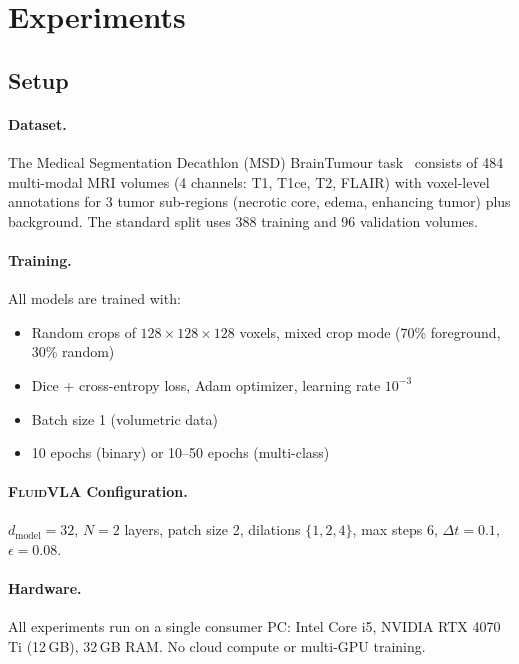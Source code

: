 \documentclass{article}
\newcommand{\fluidvla}{\textsc{FluidVLA}}
\begin{document}
\section{Experiments}
\label{sec:experiments}

\subsection{Setup}

\paragraph{Dataset.}
The Medical Segmentation Decathlon (MSD) BrainTumour task~\cite{antonelli2022msd} consists of 484 multi-modal MRI volumes (4 channels: T1, T1ce, T2, FLAIR) with voxel-level annotations for 3 tumor sub-regions (necrotic core, edema, enhancing tumor) plus background. The standard split uses 388 training and 96 validation volumes.

\paragraph{Training.}
All models are trained with:
\begin{itemize}
    \item Random crops of $128 \times 128 \times 128$ voxels, mixed crop mode (70\% foreground, 30\% random)
    \item Dice + cross-entropy loss, Adam optimizer, learning rate $10^{-3}$
    \item Batch size 1 (volumetric data)
    \item 10 epochs (binary) or 10--50 epochs (multi-class)
\end{itemize}

\paragraph{\fluidvla{} Configuration.}
$d_\text{model} = 32$, $N = 2$ layers, patch size 2, dilations $\{1, 2, 4\}$, max steps 6, $\Delta t = 0.1$, $\epsilon = 0.08$.

\paragraph{Hardware.}
All experiments run on a single consumer PC: Intel Core i5, NVIDIA RTX 4070 Ti (12\,GB), 32\,GB RAM. No cloud compute or multi-GPU training.
\end{document}
